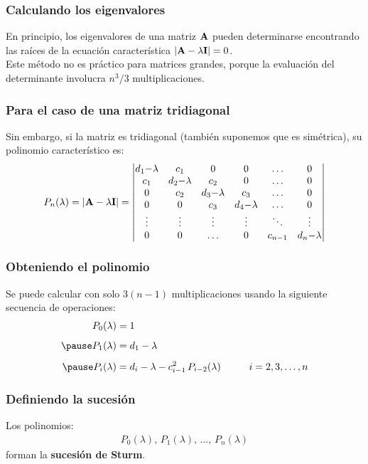 \documentclass[12pt]{beamer}
\begin{document}
\begin{frame}
\frametitle{Calculando los eigenvalores}
En principio, los eigenvalores de una matriz $\vb{A}$ pueden determinarse encontrando las raíces de la ecuación característica $\abs{\vb{A} - \lambda \vb{I}} = 0$.
\\
\bigskip
\pause
Este método no es práctico para matrices grandes, \pause porque la evaluación del determinante involucra $n^{3}/3$ multiplicaciones.
\end{frame}
\begin{frame}
\frametitle{Para el caso de una matriz tridiagonal}
Sin embargo, si la matriz es tridiagonal (también suponemos que es simétrica), su polinomio característico es:
\pause
\renewcommand{\arraystretch}{0.9}
\begin{align*}
P_{n} (\lambda) = \abs{\vb{A} - \lambda \vb{I}} = 
\mdet{
d_{1} {-} \lambda & c_{1} & 0 & 0 & \ldots & 0 \\
c_{1} & d_{2} {-} \lambda & c_{2} & 0 & \ldots & 0 \\
0 & c_{2} & d_{3} {-} \lambda & c_{3} & \ldots & 0 \\
0 & 0 & c_{3} & d_{4} {-} \lambda & \ldots & 0 \\
\vdots & \vdots & \vdots & \vdots & \ddots & \vdots \\
0 & 0 & \ldots & 0 & c_{n-1} & d_{n} {-} \lambda
}
\end{align*}
\end{frame}
\begin{frame}
\frametitle{Obteniendo el polinomio}
Se puede calcular con solo $3 (n - 1)$ multiplicaciones usando la siguiente secuencia de operaciones:
\pause
\begin{eqnarray}
\begin{aligned}
P_{0} (\lambda) &= 1 \\[0.5em] \pause
P_{1} (\lambda) &= d_{1} - \lambda \\[0.5em] \pause
P_{i} (\lambda) &= d_{i} - \lambda - c_{i-1}^{2} \, P_{i-2} (\lambda) \hspace{1cm} i = 2, 3, \ldots, n
\end{aligned}
\label{eq:ecuacion_09_49}
\end{eqnarray}
\end{frame}
\begin{frame}
\frametitle{Definiendo la sucesión}
Los polinomios:
\begin{align*}
P_{0} (\lambda), \, P_{1} (\lambda), \,  \ldots, \, P_{n} (\lambda)
\end{align*}
\pause 
forman la \textbf{\textcolor{ao}{sucesión de Sturm}}.
\end{frame}
\end{document}
